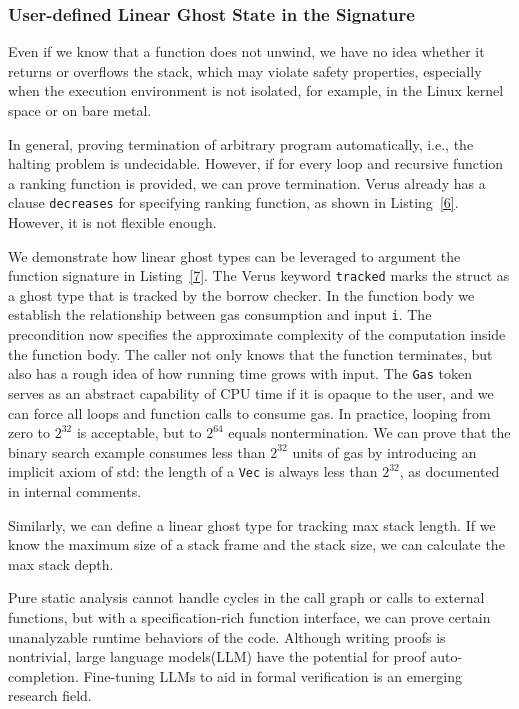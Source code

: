 \documentclass[conference]{IEEEtran}
\begin{document}
\subsubsection{User-defined Linear Ghost State in the Signature}
Even if we know that a function does not unwind, we have no idea whether it returns or overflows the stack, which may violate safety properties, especially when the execution environment is not isolated, for example, in the Linux kernel space or on bare metal.

In general, proving termination of arbitrary program automatically, i.e., the halting problem is undecidable. However, if for every loop and recursive function a ranking function is provided, we can prove termination. Verus already has a clause \texttt{decreases} for specifying ranking function, as shown in Listing~\ref{6}. However, it is not flexible enough. 

We demonstrate how linear ghost types can be leveraged to argument the function signature in Listing~\ref{7}. The Verus keyword \texttt{tracked} marks the struct as a ghost type that is tracked by the borrow checker. In the function body we establish the relationship between gas consumption and input \texttt{i}. The precondition now specifies the approximate complexity of the computation inside the function body. The caller not only knows that the function terminates, but also has a rough idea of how running time grows with input. The \texttt{Gas} token serves as an abstract capability of CPU time if it is opaque to the user, and we can force all loops and function calls to consume gas. In practice, looping from zero to $2^{32}$ is acceptable, but to $2^{64}$ equals nontermination. We can prove that the binary search example consumes less than $2^{32}$ units of gas by introducing an implicit axiom of std: the length of a \texttt{Vec} is always less than $2^{32}$, as documented in internal comments.      

Similarly, we can define a linear ghost type for tracking max stack length. If we know the maximum size of a stack frame and the stack size, we can calculate the max stack depth.  

Pure static analysis cannot handle cycles in the call graph or calls to external functions, but with a specification-rich function interface, we can prove certain unanalyzable runtime behaviors of the code. Although writing proofs is nontrivial, large language models(LLM) have the potential for proof auto-completion. Fine-tuning LLMs to aid in formal verification\cite{chen2025automatedproofgenerationrust,shefer2025llmsenableverificationmainstream} is an emerging research field.  
\end{document}
